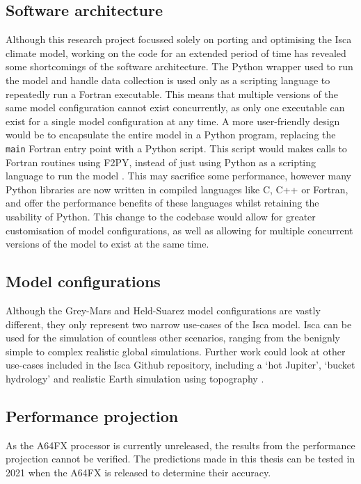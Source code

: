 \documentclass[a4paper,11pt]{report}
\begin{document}
\subsection{Software architecture}
Although this research project focussed solely on porting and optimising the Isca climate model, working on the code for an extended period of time has revealed some shortcomings of the software architecture. The Python wrapper used to run the model and handle data collection is used only as a scripting language to repeatedly run a Fortran executable. This means that multiple versions of the same model configuration cannot exist concurrently, as only one executable can exist for a single model configuration at any time. A more user-friendly design would be to encapsulate the entire model in a Python program, replacing the \texttt{main} Fortran entry point with a Python script. This script would makes calls to Fortran routines using F2PY, instead of just using Python as a scripting language to run the model \cite{peterson2009f2py}. This may sacrifice some performance, however many Python libraries are now written in compiled languages like C, C++ or Fortran, and offer the performance benefits of these languages whilst retaining the usability of Python. This change to the codebase would allow for greater customisation of model configurations, as well as allowing for multiple concurrent versions of the model to exist at the same time. 

\subsection{Model configurations}
Although the Grey-Mars and Held-Suarez model configurations are vastly different, they only represent two narrow use-cases of the Isca model. Isca can be used for the simulation of countless other scenarios, ranging from the benignly simple to complex realistic global simulations. Further work could look at other use-cases included in the Isca Github repository, including a `hot Jupiter', `bucket hydrology' and realistic Earth simulation using topography \cite{isca2019github}. 


\subsection{Performance projection}
As the A64FX processor is currently unreleased, the results from the performance projection cannot be verified. The predictions made in this thesis can be tested in 2021 when the A64FX is released to determine their accuracy.
\end{document}
